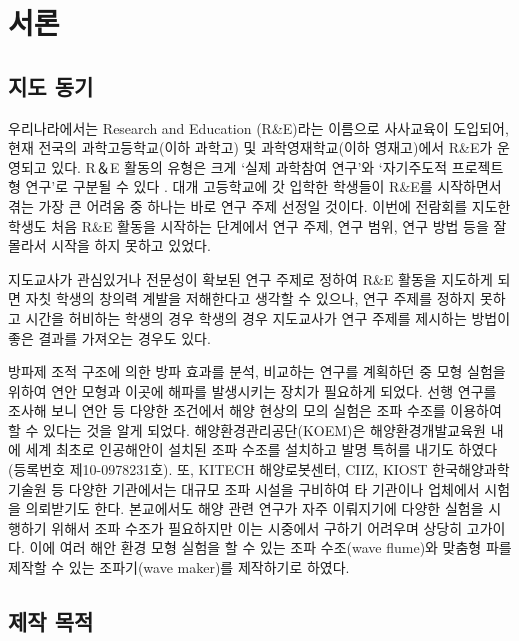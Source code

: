 \section{서론}


\subsection{지도 동기}

우리나라에서는 Research and Education (R\&E)라는 이름으로 사사교육이 도입되어, 현재 전국의 과학고등학교(이하
과학고) 및 과학영재학교(이하 영재고)에서 R\&E가 운영되고 있다. R＆E 활동의 유형은 크게 ‘실제 과학참여 연구’와 ‘자기주도적 프로젝트형 연구’로 구분될 수 있다 \cite{parkjw-2009-1}. 대개 고등학교에 갓 입학한 학생들이 R\&E를 시작하면서 겪는 가장 큰 어려움 중 하나는 바로 연구 주제 선정일 것이다. 이번에 전람회를 지도한 학생도 처음 R\&E 활동을 시작하는 단계에서 연구 주제, 연구 범위, 연구 방법 등을 잘 몰라서 시작을 하지 못하고 있었다. 

지도교사가 관심있거나 전문성이 확보된 연구 주제로 정하여 R\&E 활동을 지도하게 되면 자칫 학생의 창의력 계발을 저해한다고 생각할 수 있으나, 연구 주제를 정하지 못하고 시간을 허비하는 학생의 경우 학생의 경우 지도교사가 연구  주제를 제시하는 방법이 좋은 결과를 가져오는 경우도 있다. 

방파제 조적 구조에 의한 방파 효과를 분석, 비교하는 연구를 계획하던 중 모형 실험을 위하여 연안 모형과 이곳에 해파를 발생시키는 장치가 필요하게 되었다. 선행 연구를 조사해 보니 연안 등 다양한 조건에서 해양 현상의 모의 실험은 조파 수조를 이용하여 할 수 있다는 것을 알게 되었다\cite{chung2013}. 해양환경관리공단(KOEM)은 해양환경개발교육원 내에 세계 최초로 인공해안이 설치된 조파 수조를 설치하고 발명 특허를 내기도 하였다 (등록번호 제10-0978231호). 또, KITECH 해양로봇센터, CIIZ, KIOST 한국해양과학기술원 등 다양한 기관에서는 대규모 조파 시설을 구비하여 타 기관이나 업체에서 시험을 의뢰받기도 한다. 본교에서도 해양 관련 연구가 자주 이뤄지기에 다양한 실험을 시행하기 위해서 조파 수조가 필요하지만 이는 시중에서 구하기 어려우며 상당히 고가이다. 이에 여러 해안 환경 모형 실험을 할 수 있는 조파 수조(wave flume)와 맞춤형 파를 제작할 수 있는 조파기(wave maker)를 제작하기로 하였다. 


\subsection{제작 목적}

